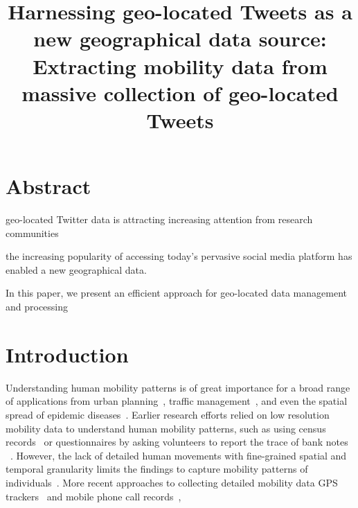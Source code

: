 \documentclass[a4paper,11pt]{article}
\begin{document}

\title{Harnessing  geo-located Tweets as a new geographical data source: Extracting mobility data from massive collection of geo-located Tweets}


\maketitle
\section*{Abstract}
geo-located Twitter data is attracting increasing attention from research communities

the increasing popularity of accessing today's pervasive social media platform has enabled a new geographical data.

In this paper, we present an efficient approach for geo-located data management and processing

\section{Introduction}
Understanding human mobility patterns is of great importance for a broad range of applications from urban planning~\cite{zheng2008}, traffic management~\cite{jiang2009}, and even the spatial spread of epidemic diseases~\cite{belik2011}.
Earlier research efforts relied on low resolution mobility data to understand human mobility patterns, such as using census records~\cite{greenwood1985} or questionnaires by asking volunteers to report the trace of bank notes ~\cite{brockmann2006}.
However, the lack of detailed human movements with fine-grained spatial and temporal granularity limits the findings to capture mobility patterns of individuals~\cite{gonzalez2008,jurdak2015}.
More recent approaches to collecting detailed mobility data 
GPS trackers~\cite{zheng2008understanding, rhee2011levy} and mobile phone call records~\cite{gonzalez2008understanding,sevtsuk2010does,kung2014exploring}, 
\end{document}
